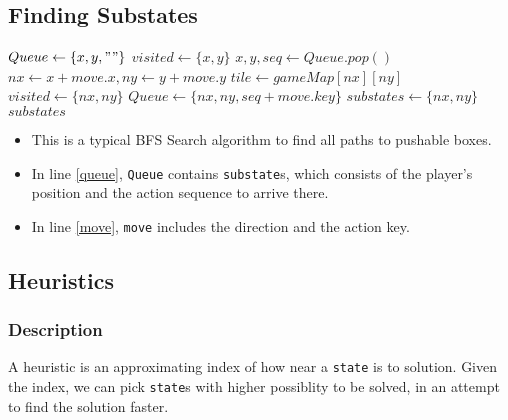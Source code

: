 \documentclass[a4paper, 10pt]{article}
\begin{document}
        \subsection{Finding Substates}
            \begin{algorithmic}[1]
                \State $Queue \gets \{x, y, ""\}$ \label{queue}
                \State $visited \gets \{x, y\}$
                    \State $x, y, seq \gets Queue.pop()$
                     \label{move}
                        \State $nx \gets x + move.x, ny \gets y + move.y$
                        \State $tile \gets gameMap[nx][ny]$
                            \State $visited \gets \{nx, ny\}$
                            \State $Queue \gets \{nx, ny, seq + move.key\}$
                            \State $substates \gets \{nx, ny\}$
                        \EndIf
                    \EndFor
                \EndWhile
                \State \Return $substates$
            \end{algorithmic}

            \begin{itemize}
                \item This is a typical BFS Search algorithm to find all paths to pushable boxes.
                \item In line \ref{queue}, \texttt{Queue} contains \texttt{substate}s, 
                    which consists of the player's position and the action sequence to arrive there.
                \item In line \ref{move}, \texttt{move} includes the direction and the action key.
            \end{itemize}

        \subsection{Heuristics}

            \subsubsection{Description}
                A heuristic is an approximating index of how near a \texttt{state} is to solution.
                Given the index, we can pick \texttt{state}s with higher possiblity to be solved, 
                in an attempt to find the solution faster.
\end{document}
